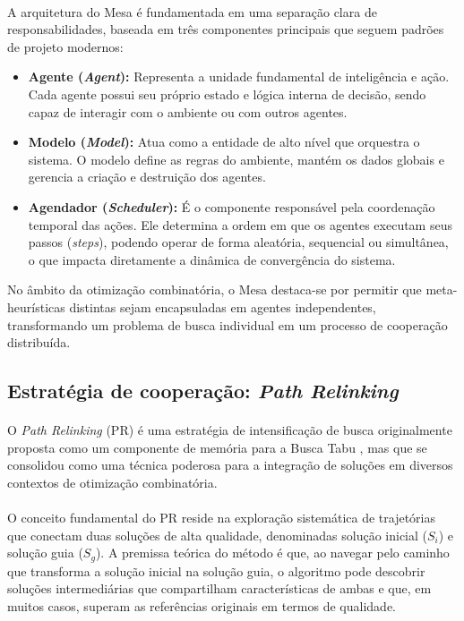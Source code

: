 \paragraph{}A arquitetura do Mesa é fundamentada em uma separação clara de responsabilidades, baseada em três componentes principais que seguem padrões de projeto modernos:

\begin{itemize}
    \item \textbf{Agente (\textit{Agent}):} Representa a unidade fundamental de inteligência e ação. Cada agente possui seu próprio estado e lógica interna de decisão, sendo capaz de interagir com o ambiente ou com outros agentes.
    
    \item \textbf{Modelo (\textit{Model}):} Atua como a entidade de alto nível que orquestra o sistema. O modelo define as regras do ambiente, mantém os dados globais e gerencia a criação e destruição dos agentes.
    
    \item \textbf{Agendador (\textit{Scheduler}):} É o componente responsável pela coordenação temporal das ações. Ele determina a ordem em que os agentes executam seus passos (\textit{steps}), podendo operar de forma aleatória, sequencial ou simultânea, o que impacta diretamente a dinâmica de convergência do sistema.
\end{itemize}

No âmbito da otimização combinatória, o Mesa destaca-se por permitir que meta-heurísticas distintas sejam encapsuladas em agentes independentes, transformando um problema de busca individual em um processo de cooperação distribuída.

\subsection{Estratégia de cooperação: \textit{Path Relinking}}

\paragraph{} O \textit{Path Relinking} (PR) é uma estratégia de intensificação de busca originalmente proposta como um componente de memória para a Busca Tabu \cite{Glover00}, mas que se consolidou como uma técnica poderosa para a integração de soluções em diversos contextos de otimização combinatória.

\paragraph{} O conceito fundamental do PR reside na exploração sistemática de trajetórias que conectam duas soluções de alta qualidade, denominadas solução inicial ($S_i$) e solução guia ($S_g$). A premissa teórica do método é que, ao navegar pelo caminho que transforma a solução inicial na solução guia, o algoritmo pode descobrir soluções intermediárias que compartilham características de ambas e que, em muitos casos, superam as referências originais em termos de qualidade.

